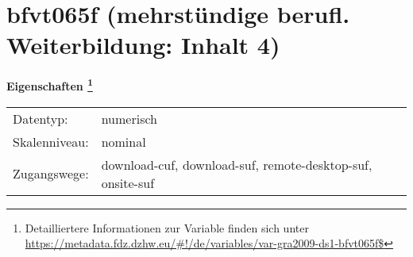 
    \setcounter{footnote}{0}

    \vspace*{-1.8cm}
	\section{bfvt065f (mehrstündige berufl. Weiterbildung: Inhalt 4)}
	\label{section:bfvt065f}



    \vspace*{0.5cm}
    \noindent\textbf{Eigenschaften
	\footnote{Detailliertere Informationen zur Variable finden sich unter
		\url{https://metadata.fdz.dzhw.eu/\#!/de/variables/var-gra2009-ds1-bfvt065f$}}}\\
	\begin{tabularx}{\hsize}{@{}lX}
	Datentyp: & numerisch \\
	Skalenniveau: & nominal \\
	Zugangswege: &
	  download-cuf, 
	  download-suf, 
	  remote-desktop-suf, 
	  onsite-suf
 \\
    \end{tabularx}



